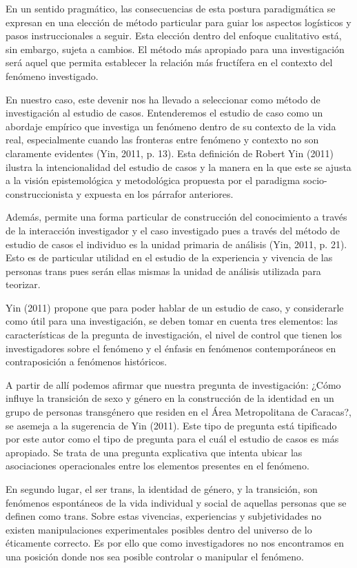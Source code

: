 En un sentido pragmático, las consecuencias de esta postura paradigmática se
expresan en una elección de método particular para guiar los aspectos logísticos
y pasos instruccionales a seguir.
Esta elección dentro del enfoque cualitativo está, sin embargo, sujeta a
cambios.
El método más apropiado para una investigación será aquel que permita establecer
la relación más fructífera en el contexto del fenómeno investigado.

En nuestro caso, este devenir nos ha llevado a seleccionar como método de
investigación al estudio de casos.
Entenderemos el estudio de caso como un abordaje empírico que investiga un
fenómeno dentro de su contexto de la vida real, especialmente cuando las
fronteras entre fenómeno y contexto no son claramente evidentes (Yin, 2011, p.
13).
Esta definición de Robert Yin (2011) ilustra la intencionalidad del estudio de
casos y la manera en la que este se ajusta a la visión epistemológica y
metodológica propuesta por el paradigma socio-construccionista y expuesta en los
párrafor anteriores.

Además, permite una forma particular de construcción del conocimiento a través
de la interacción investigador y el caso investigado pues a través del método de
estudio de casos el individuo es la unidad primaria de análisis (Yin, 2011, p.
21).
Esto es de particular utilidad en el estudio de la experiencia y vivencia de las
personas trans pues serán ellas mismas la unidad de análisis utilizada para
teorizar.

Yin (2011) propone que para poder hablar de un estudio de caso, y considerarle
como útil para una investigación, se deben tomar en cuenta tres elementos: las
características de la pregunta de investigación, el nivel de control que tienen
los investigadores sobre el fenómeno y el énfasis en fenómenos contemporáneos en
contraposición a fenómenos históricos.

A partir de allí podemos afirmar que nuestra pregunta de investigación: ¿Cómo
influye la transición de sexo y género en la construcción de la identidad en un
grupo de personas transgénero que residen en el Área Metropolitana de  Caracas?,
se asemeja a la sugerencia de Yin (2011).
Este tipo de pregunta está tipificado por este autor como el tipo de pregunta
para el cuál el estudio de casos es más apropiado.
Se trata de una pregunta explicativa que intenta ubicar las asociaciones
operacionales entre los elementos presentes en el fenómeno.

En segundo lugar, el ser trans, la identidad de género, y la transición, son
fenómenos espontáneos de la vida individual y social de aquellas personas que se
definen como trans.
Sobre estas vivencias, experiencias y subjetividades no existen manipulaciones
experimentales posibles dentro del universo de lo éticamente correcto.
Es por ello que como investigadores no nos encontramos en una posición donde nos
sea posible controlar o manipular el fenómeno.


